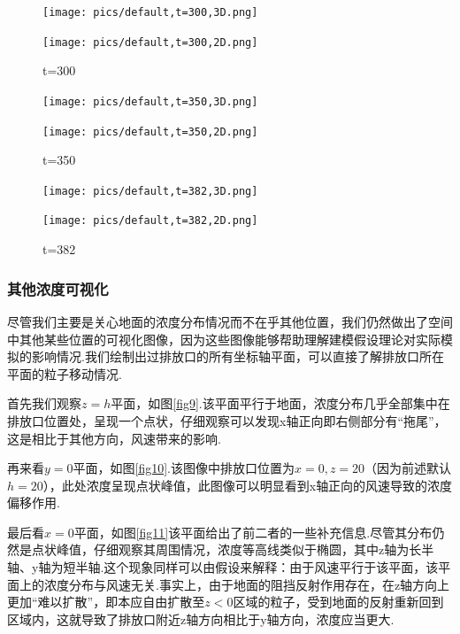 \documentclass{article}
\begin{document}
	\begin{figure}[htbp]
		\begin{minipage}{0.49\textwidth}
			\texttt{[image: pics/default,t=300,3D.png]}
		\end{minipage}
		\begin{minipage}{0.49\textwidth}
			\texttt{[image: pics/default,t=300,2D.png]}
		\end{minipage}
		\caption{t=300}
		\label{fig6}
	\end{figure}

	
	\begin{figure}[htbp]
		\begin{minipage}{0.49\textwidth}
			\texttt{[image: pics/default,t=350,3D.png]}
		\end{minipage}
		\begin{minipage}{0.49\textwidth}
			\texttt{[image: pics/default,t=350,2D.png]}
		\end{minipage}
		\caption{t=350}
		\label{fig7}
	\end{figure}

	\begin{figure}[htbp]
		\begin{minipage}{0.49\textwidth}
			\texttt{[image: pics/default,t=382,3D.png]}
		\end{minipage}
		\begin{minipage}{0.49\textwidth}
			\texttt{[image: pics/default,t=382,2D.png]}
		\end{minipage}
		\caption{t=382}
		\label{fig8}
	\end{figure}

	\subsubsection{其他浓度可视化}
	尽管我们主要是关心地面的浓度分布情况而不在乎其他位置，我们仍然做出了空间中其他某些位置的可视化图像，因为这些图像能够帮助理解建模假设理论对实际模拟的影响情况.我们绘制出过排放口的所有坐标轴平面，可以直接了解排放口所在平面的粒子移动情况.
	\par 首先我们观察$z=h$平面，如图\ref{fig9}.该平面平行于地面，浓度分布几乎全部集中在排放口位置处，呈现一个点状，仔细观察可以发现x轴正向即右侧部分有“拖尾”，这是相比于其他方向，风速带来的影响.
	\par 再来看$y=0$平面，如图\ref{fig10}.该图像中排放口位置为$x=0, z=20$（因为前述默认$h=20$），此处浓度呈现点状峰值，此图像可以明显看到x轴正向的风速导致的浓度偏移作用.
	\par 最后看$x=0$平面，如图\ref{fig11}该平面给出了前二者的一些补充信息.尽管其分布仍然是点状峰值，仔细观察其周围情况，浓度等高线类似于椭圆，其中z轴为长半轴、y轴为短半轴.这个现象同样可以由假设来解释：由于风速平行于该平面，该平面上的浓度分布与风速无关.事实上，由于地面的阻挡反射作用存在，在z轴方向上更加“难以扩散”，即本应自由扩散至$z<0$区域的粒子，受到地面的反射重新回到区域内，这就导致了排放口附近z轴方向相比于y轴方向，浓度应当更大.
	
\end{document}

